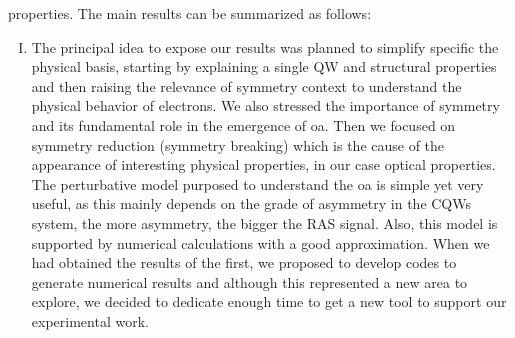 properties. The main results can be summarized as follows:
\begin{enumerate}[I)]

\item The principal idea to expose our results was planned to simplify specific the physical basis, starting by explaining a single \gls{QW} and structural properties and then raising the relevance of symmetry context to understand the physical behavior of electrons. We also stressed the importance of symmetry and its fundamental
role in the emergence of \gls{oa}. Then we focused on symmetry reduction (symmetry breaking) which is the cause of the appearance of interesting physical properties, in our case optical properties. The perturbative model purposed to understand the \gls{oa} is simple yet very useful, as this mainly depends on the grade of asymmetry in the \gls{CQWs} system, the more asymmetry, the bigger the RAS signal. Also, this model is supported by numerical calculations with a good approximation. When we had obtained the results of the first, we proposed to develop codes to generate numerical results and although this represented a new area to explore, we decided to dedicate enough time to get a new tool to support our experimental work.

\end{enumerate}
